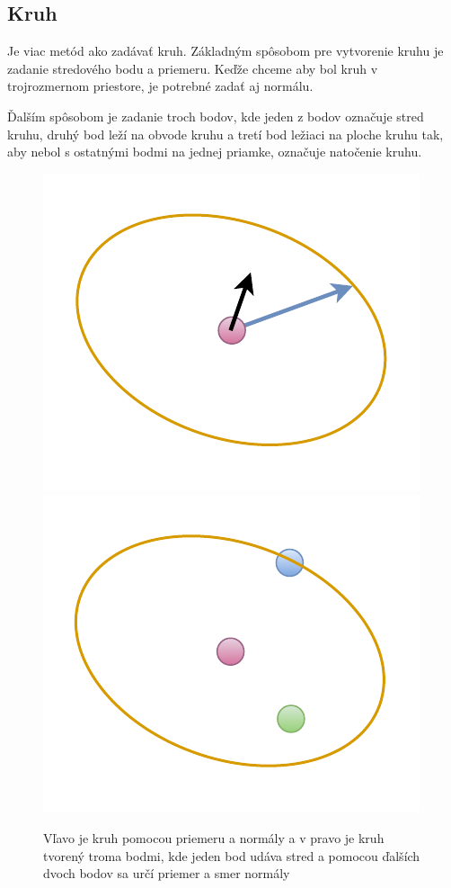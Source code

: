 








\subsection*{Kruh}
Je viac metód ako zadávať kruh. Základným spôsobom pre vytvorenie kruhu je zadanie stredového bodu a priemeru. Keďže chceme aby bol kruh v trojrozmernom priestore, je potrebné zadať aj normálu. 

Ďalším spôsobom je zadanie troch bodov, kde jeden z bodov označuje stred kruhu, druhý bod leží na obvode kruhu a tretí bod ležiaci na ploche kruhu tak, aby nebol s ostatnými bodmi na jednej priamke, označuje natočenie kruhu.

\begin{figure}[H]
	\centering
	\includegraphics[height=0.3\textwidth]{obrazky-figures/Diagram/Draw/3Plane/DP Navrh operacii-2D - SurfaceCreate Circle.pdf}
	\includegraphics[height=0.3\textwidth]{obrazky-figures/Diagram/Draw/3Plane/DP Navrh operacii-2D - SurfaceCreate Circle2.pdf}
	\caption{Vľavo je kruh pomocou priemeru a normály a v pravo je kruh tvorený troma bodmi, kde jeden bod udáva stred a pomocou ďalších dvoch bodov sa určí priemer a smer normály}
	\label{fig:SurfaceCreate Circle2}
\end{figure}

